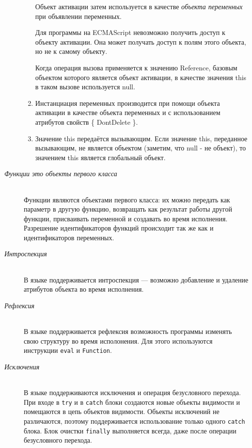 \begin{description}
\begin{enumerate}
	  Объект активации затем используется в качестве
	  \emph{объекта переменных} при объявлении переменных.

	  Для программы на ECMAScript невозможно получить доступ к
	  объекту активации. Она может получать доступ к полям этого
	  объекта, но не к самому объекту. 
	  
	  Когда операция вызова применяется к значению Reference,
	  базовым объектом которого является объект активации, в
	  качестве значения this в таком вызове используется null.

	\item Инстанциация переменных производится при помощи объекта
	  активации в качестве объекта переменных и с использованием
	  атрибутов свойств \{ DontDelete \}.

	\item Значение this передаётся вызывающим. Если значение this,
	  переданное вызывающим, не является объектом (заметим, что
	  null - не объект), то значением this является глобальный
	  объект.
      \end{enumerate}


    \item[\emph{Функции это объекты первого класса}]~\\  %
      Функции являются объектами первого класса: их можно передать как
      параметр в другую функцию, возвращать как результат работы другой
      функции, присваивать переменной и создавать во время исполнения.
      Разрешение идентификаторов функций происходит так же как и
      идентификаторов переменных.
    \item[\emph{Интроспекция}]~\\  %
      В языке поддерживается интроспекция --- возможно добавление и
      удаление атрибутов объекта во время исполнения.
    \item[\emph{Рефлексия}]~\\  %
      В языке поддерживается рефлексия возможность программы изменять
      свою структуру во время исполонения. Для этого используются
      инструкции \texttt{eval} и \texttt{Function}.
    \item[\emph{Исключения}]~\\  %
    В языке поддерживаются исключения и операция безусловного перехода. При
    входе в \texttt{try} и в \texttt{catch} блоки создаются новые объекты
    видимости и помещаются в цепь объектов видимости. Объекты исключений не
    различаются, поэтому поддерживается использование только одного
    \texttt{catch} блока. Блок очистки \texttt{finally} выполняется
    всегда, даже после операции безусловного перехода.

\end{description}

